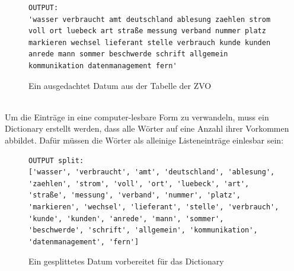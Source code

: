 \documentclass[german,version-2020-11]{uzl-thesis}
\begin{document}

\begin{figure}[h]
\begin{lstlisting}
OUTPUT: 
'wasser verbraucht amt deutschland ablesung zaehlen strom voll ort luebeck art straße messung verband nummer platz markieren wechsel lieferant stelle verbrauch kunde kunden anrede mann sommer beschwerde schrift allgemein kommunikation datenmanagement fern'
\end{lstlisting}
\caption{Ein ausgedachtet Datum aus der Tabelle der ZVO}
\end{figure}\\

Um die Einträge in eine computer-lesbare Form zu verwandeln, muss ein Dictionary erstellt werden, dass alle Wörter auf eine Anzahl ihrer Vorkommen abbildet. Dafür müssen die Wörter als alleinige Listeneinträge einlesbar sein: \\


\begin{figure}[h]
\begin{lstlisting}
OUTPUT split: 
['wasser', 'verbraucht', 'amt', 'deutschland', 'ablesung', 'zaehlen', 'strom', 'voll', 'ort', 'luebeck', 'art', 'straße', 'messung', 'verband', 'nummer', 'platz', 'markieren', 'wechsel', 'lieferant', 'stelle', 'verbrauch', 'kunde', 'kunden', 'anrede', 'mann', 'sommer', 'beschwerde', 'schrift', 'allgemein', 'kommunikation', 'datenmanagement', 'fern']
\end{lstlisting}
\caption{Ein gesplittetes Datum vorbereitet für das Dictionary}
\end{figure}\\
\end{document}

